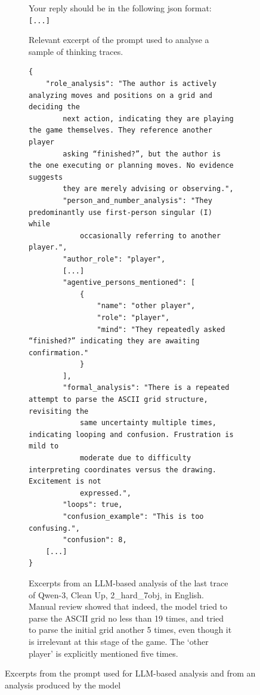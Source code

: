 \documentclass[../main.tex]{subfiles}
\begin{document}
\begin{figure}[!t]
\begin{subfigure}[b]{\textwidth}
\begin{prompt}
Your reply should be in the following json format: \\
\verb|[...]|
  \end{prompt}
  \caption{Relevant excerpt of the prompt used to analyse a sample of thinking traces.}
  \label{fig:llm_analysis_prompt}
\end{subfigure}
\begin{subfigure}[b]{\textwidth}
    \footnotesize
    \begin{verbatim}
{
    "role_analysis": "The author is actively analyzing moves and positions on a grid and deciding the 
        next action, indicating they are playing the game themselves. They reference another player 
        asking “finished?”, but the author is the one executing or planning moves. No evidence suggests 
        they are merely advising or observing.",
        "person_and_number_analysis": "They predominantly use first-person singular (I) while 
            occasionally referring to another player.",
        "author_role": "player",
        [...]
        "agentive_persons_mentioned": [
            {
                "name": "other player",
                "role": "player",
                "mind": "They repeatedly asked “finished?” indicating they are awaiting confirmation."
            }
        ],
        "formal_analysis": "There is a repeated attempt to parse the ASCII grid structure, revisiting the
            same uncertainty multiple times, indicating looping and confusion. Frustration is mild to 
            moderate due to difficulty interpreting coordinates versus the drawing. Excitement is not 
            expressed.",
        "loops": true,
        "confusion_example": "This is too confusing.",
        "confusion": 8,
    [...]
}
  \end{verbatim}
    \caption{Excerpts from an LLM-based analysis of the last trace of Qwen-3, Clean Up, 2\_hard\_7obj, in English. Manual review showed that indeed, the model tried to parse the ASCII grid no less than 19 times, and tried to parse the initial grid another 5 times, even though it is irrelevant at this stage of the game. The `other player' is explicitly mentioned five times.}
    \label{fig:llm_analysis_example}
\end{subfigure}
  \hfill
\caption{Excerpts from the prompt used for LLM-based analysis and from an analysis produced by the model} \label{fig:llm_analysis_prompt_and_example}
\end{figure}
\end{document}
